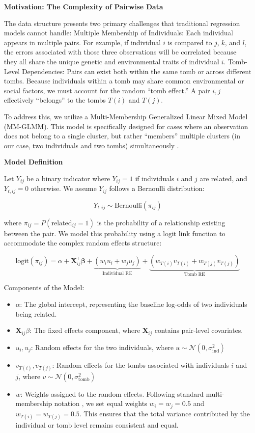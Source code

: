 \documentclass[
]{ajs}
\providecommand{\tightlist}{%
  \setlength{\itemsep}{0pt}\setlength{\parskip}{0pt}}
\begin{document}
\textbf{Motivation: The Complexity of Pairwise Data}

The data structure presents two primary challenges that traditional
regression models cannot handle: Multiple Membership of Individuals:
Each individual appears in multiple pairs. For example, if individual
\(i\) is compared to \(j\), \(k\), and \(l\), the errors associated with
those three observations will be correlated because they all share the
unique genetic and environmental traits of individual \(i\). Tomb-Level
Dependencies: Pairs can exist both within the same tomb or across
different tombs. Because individuals within a tomb may share common
environmental or social factors, we must account for the random ``tomb
effect.'' A pair \({i,j}\) effectively ``belongs'' to the tombs \(T(i)\)
and \(T(j)\).

To address this, we utilize a Multi-Membership Generalized Linear Mixed
Model (MM-GLMM). This model is specifically designed for cases where an
observation does not belong to a single cluster, but rather ``members''
multiple clusters (in our case, two individuals and two tombs)
simultaneously \citet{browne2001multiple}.

\textbf{Model Definition}

Let \(Y_{ij}\) be a binary indicator where \(Y_{ij} = 1\) if individuals
\(i\) and \(j\) are related, and \(Y_{t,ij} = 0\) otherwise. We assume
\(Y_{ij}\) follows a Bernoulli distribution:

\[
Y_{t,ij} \sim \text{Bernoulli}(\pi_{ij})
\]

where \(\pi_{ij} = P(\text{related}_{ij} = 1)\) is the probability of a
relationship existing between the pair. We model this probability using
a logit link function to accommodate the complex random effects
structure:

\[
\text{logit}(\pi_{ij}) = \alpha + \mathbf{X}_{ij}^{\top}\boldsymbol{\beta} 
    + \underbrace{(w_i u_i + w_j u_j)}_{\text{Individual RE}} 
    + \underbrace{(w_{T(i)} v_{T(i)} + w_{T(j)} v_{T(j)})}_{\text{Tomb RE}}
\]

Components of the Model:

\begin{itemize}
\tightlist
\item
  \(\alpha\): The global intercept, representing the baseline log-odds
  of two individuals being related.
\item
  \(\mathbf{X}_{ij} \beta\): The fixed effects component, where
  \(\mathbf{X}_{ij}\) contains pair-level covariates.
\item
  \(u_i, u_j\): Random effects for the two individuals, where
  \(u \sim \mathcal{N}(0, \sigma^2_{\text{ind}})\)
\item
  \(v_{T(i)}, v_{T(j)}\): Random effects for the tombs associated with
  individuals \(i\) and \(j\), where
  \(v \sim \mathcal{N}(0, \sigma^2_{\text{tomb}})\)
\item
  \(w\): Weights assigned to the random effects. Following standard
  multi-membership notation \citet{browne2001multiple}, we set equal
  weights \(w_i = w_j = 0.5\) and \(w_{T(i)} = w_{T(j)} = 0.5\). This
  ensures that the total variance contributed by the individual or tomb
  level remains consistent and equal.
\end{itemize}
\end{document}
